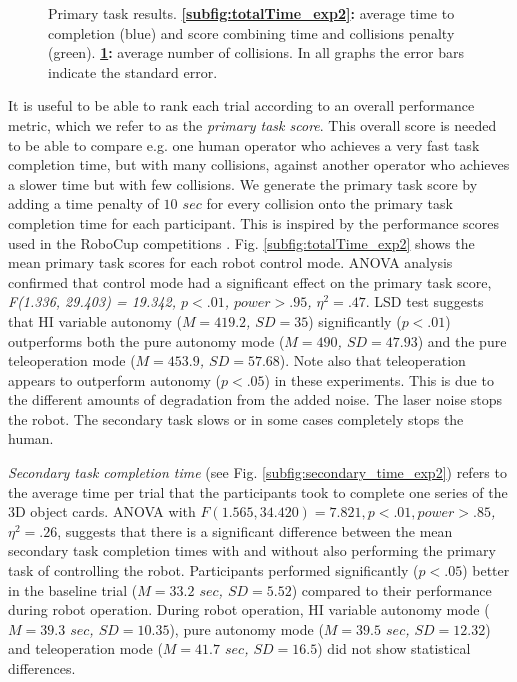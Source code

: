 \documentclass[a4paper,12pt,oneside,openright]{bhamthesis}
\begin{document}
\begin{figure}
\begin{subfigure}[b]{0.49\textwidth}
			\caption{}
			\label{subfig:totalCollisions_exp2}
		\end{subfigure}
		\hfill
		\caption{Primary task results. \textbf{\ref{subfig:totalTime_exp2}:} average time to completion (blue) and score combining time and collisions penalty (green). \textbf{\ref{subfig:totalCollisions_exp2}:} average number of collisions. In all graphs the error bars indicate the standard error.}
		\label{fig:time_collisions_exp2}
	\end{figure}
	
It is useful to be able to rank each trial according to an overall performance metric, which we refer to as the \textit{primary task score}. This overall score is needed to be able to compare e.g. one human operator who achieves a very fast task completion time, but with many collisions, against another operator who achieves a slower time but with few collisions. We generate the primary task score by adding a time penalty of \textit{$10$ $sec$} for every collision onto the primary task completion time for each participant. This is inspired by the performance scores used in the RoboCup competitions \citep{Jacoff2003a}. Fig. \ref{subfig:totalTime_exp2} shows the mean primary task scores for each robot control mode. ANOVA analysis confirmed that control mode had a significant effect on the primary task score, \textit{F(1.336, 29.403) = 19.342, $p < .01$, $power > .95$, $\eta^2 = .47$}. LSD test suggests that HI variable autonomy (\textit{$M = 419.2$, $SD = 35$}) significantly (\textit{$p <.01$}) outperforms both the pure autonomy mode (\textit{$M = 490$, $SD = 47.93$}) and the pure teleoperation mode (\textit{$M = 453.9$, $SD = 57.68$}). Note also that teleoperation appears to outperform autonomy (\textit{$p <.05$}) in these experiments. This is due to the different amounts of degradation from the added noise. The laser noise stops the robot. The secondary task slows or in some cases completely stops the human.

\textit{Secondary task completion time} (see Fig. \ref{subfig:secondary_time_exp2}) refers to the average time per trial that the participants took to complete one series of the 3D object cards. ANOVA with \textit{$F(1.565, 34.420) = 7.821, p < .01 , power > .85$, $\eta^2 = .26$}, suggests that there is a significant difference between the mean secondary task completion times with and without also performing the primary task of controlling the robot. Participants performed significantly ($p < .05$) better in the baseline trial (\textit{$M = 33.2$ $sec$, $SD = 5.52$}) compared to their performance during robot operation. During robot operation, HI variable autonomy mode (\textit{$M = 39.3$ $sec$, $SD = 10.35$}), pure autonomy mode (\textit{$M = 39.5$ $sec$, $SD = 12.32$}) and teleoperation mode (\textit{$M = 41.7$ $sec$, $SD = 16.5$}) did not show statistical differences.
\end{document}

